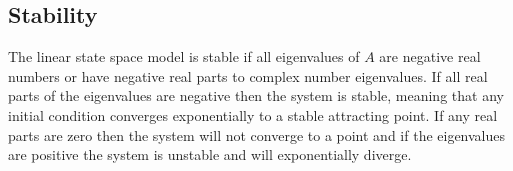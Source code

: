 \subsection{Stability}

The linear state space model is stable if all eigenvalues of $A$ are negative real numbers or have negative real parts to complex number eigenvalues. If all real parts of the eigenvalues are negative then the system is stable, meaning that any initial condition converges exponentially to a stable attracting point. If any real parts are zero then the system will not converge to a point and if the eigenvalues are positive the system is unstable and will exponentially diverge.





